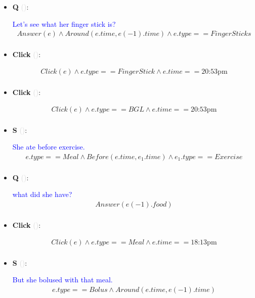 \documentclass[11pt]{article}
\newcounter{CQ}
\newcounter{CS}
\newcounter{CClick}
\newcommand{\key}[1]{\textcolor{lightgray}{#1}}
\begin{document}
\begin{itemize}
    
	\item
	\textbf{Q\theCQ} \key{()}: \addtocounter{CQ}{1}
	\textcolor{blue}{ Let's see what her finger stick is? }
	\begin{multline*}
	Answer(e) \wedge Around(e.time, e(-1).time) \wedge e.type==FingerSticks \\
	\end{multline*}
	
	\item
	\textbf{Click\theCClick} \key{()}: \addtocounter{CClick}{1}
	\begin{multline*}
	Click(e) \wedge e.type == FingerStick \wedge e.time == \mbox{20:53pm}  \\
	\end{multline*}
	
	
	\item
	\textbf{Click\theCClick} \key{()}: \addtocounter{CClick}{1}
	\begin{multline*}
	Click(e) \wedge e.type == BGL \wedge e.time == \mbox{20:53pm}  \\
	\end{multline*}
	
	\item
	\textbf{S\theCS} \key{()}: \addtocounter{CS}{1}
	\textcolor{blue}{ She ate before exercise. }
	\begin{multline*}
	e.type==Meal \wedge Before(e.time, e_1.time) \wedge e_1.type==Exercise \\
	\end{multline*}
	
	\item
	\textbf{Q\theCQ} \key{()}: \addtocounter{CQ}{1}
	\textcolor{blue}{ what did she have? }
	\begin{multline*}
	Answer(e(-1).food)\\
	\end{multline*}
	
	\item
	\textbf{Click\theCClick} \key{()}: \addtocounter{CClick}{1}
	\begin{multline*}
	Click(e) \wedge e.type == Meal \wedge e.time == \mbox{18:13pm}  \\
	\end{multline*}
	
	\item
	\textbf{S\theCS} \key{()}: \addtocounter{CS}{1}
	\textcolor{blue}{ But she bolused with that meal. }
	\begin{multline*}
	e.type == Bolus \wedge Around(e.time, e(-1).time) \\
	\end{multline*}
	

\end{itemize}
\end{document}
